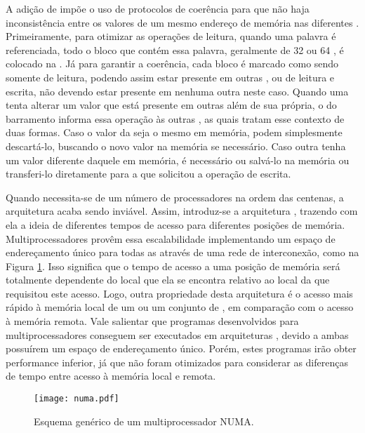 A adição de \caches impõe o uso de protocolos de coerência para que não haja inconsistência entre os valores de um mesmo endereço de memória nas diferentes \caches. Primeiramente, para otimizar as operações de leitura, quando uma palavra é referenciada, todo o bloco que contém essa palavra, geralmente de 32 ou 64 \bytes, é colocado na \cache. Já para garantir a coerência, cada bloco é marcado como sendo somente de leitura, podendo assim estar presente em outras \caches, ou de leitura e escrita, não devendo estar presente em nenhuma outra \cache neste caso. Quando uma \CPU tenta alterar um valor que está presente em outras \caches além de sua própria, o \hardware do barramento informa essa operação às outras \caches, as quais tratam esse contexto de duas formas. Caso o valor da \cache seja o mesmo em memória, podem simplesmente descartá-lo, buscando o novo valor na memória se necessário. Caso outra \cache tenha um valor diferente daquele em memória, é necessário ou salvá-lo na memória ou transferi-lo diretamente para a \cache que solicitou a operação de escrita.

Quando necessita-se de um número de processadores na ordem das centenas, a arquitetura \UMA acaba sendo inviável. Assim, introduz-se a arquitetura \NUMA, trazendo com ela a ideia de diferentes tempos de acesso para diferentes posições de memória. Multiprocessadores \NUMA provêm essa escalabilidade implementando um espaço de endereçamento único para todas as \CPUs através de uma rede de interconexão, como na Figura \ref{fig:multiprocessadornuma}. Isso significa que o tempo de acesso a uma posição de memória será totalmente dependente do local que ela se encontra relativo ao local da \CPU que requisitou este acesso. Logo, outra propriedade desta arquitetura é o acesso mais rápido à memória local de um ou um conjunto de \CPUs, em comparação com o acesso à memória remota. Vale salientar que programas desenvolvidos para multiprocessadores \UMA conseguem ser executados em arquiteturas \NUMA, devido a ambas possuírem um espaço de endereçamento único. Porém, estes programas irão obter performance inferior, já que não foram otimizados para considerar as diferenças de tempo entre acesso à memória local e remota.

\begin{figure}[tb]
  \centering
  \caption{Esquema genérico de um multiprocessador NUMA.}
  \label{fig:multiprocessadornuma}
  \texttt{[image: numa.pdf]}
\end{figure}


